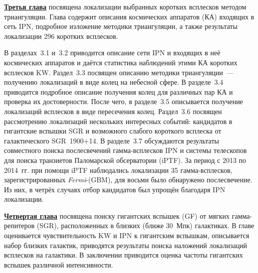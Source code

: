 \underline{\textbf{Третья глава}} посвящена локализации выбранных коротких всплесков 
методом триангуляции. Глава содержит описания космических аппаратов (КА) входящих в сеть IPN, 
подробное изложение методики триангуляции, а также результаты локализации 
296 коротких всплесков.  

В разделах~3.1 и~3.2 приводится описание сети IPN и входящих в неё космических 
аппаратов и даётся статистика наблюдений этими КА коротких всплесков KW. 
Раздел~3.3 посвящен описанию методики триангуляции~--- получению локализаций в 
виде колец на небесной сфере. В разделе~3.4 приводится подробное описание получения
колец для различных пар КА и проверка их достоверности. После чего, в разделе~3.5 описывается
получение локализаций всплесков в виде пересечения колец. Раздел~3.6 посвящен 
рассмотрению локализаций нескольких интересных событий: кандидатов в гигантские вспышки SGR 
и возможного слабого короткого всплеска от галактического SGR~1900$+$14.
В разделе~3.7 обсуждаются результаты совместного поиска послесвечений гамма-всплесков IPN 
и системы телескопов для поиска транзиетов Паломарской обсерватории
(iPTF). За период с 2013 по 2014~гг. при помощи iPTF наблюдались локализации 35 гамма-всплесков, 
зарегистрированных \textit{Fermi}-(GBM), для восьми было обнаружено послесвечение. 
Из них, в четрёх случаях отбор кандидатов был упрощён благодаря IPN локализации. 

\underline{\textbf{Четвертая глава}} посвящена поиску гигантских вспышек (GF) от мягких
гамма-репитеров (SGR), расположенных в близких (ближе 30~Мпк) галактиках.
В главе оценивается чувствительность KW и IPN к гигантским вспышкам, 
описывается набор близких галактик, приводятся результаты поиска наложений локализаций
всплесков на галактики. В заключении приводится оценка частоты гигантских вспышек различной 
интенсивности.

